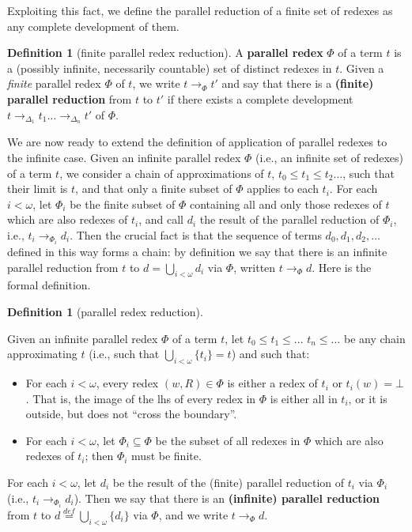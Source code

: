 \documentclass{eptcs}
\theoremstyle{plain}
\theoremstyle{definition}
\newtheorem{definition}[theorem]{Definition}
\begin{document}
Exploiting this fact, we define the parallel reduction  
of a finite set of redexes as any complete development of them.


\begin{definition} [finite parallel redex reduction]
\label{de:parallel-rdx}
A {\bf parallel redex} $\Phi$ of a term $t$ is a (possibly infinite, 
necessarily
countable) set of distinct redexes in $t$.  
Given a {\em finite} parallel redex $\Phi$ of $t$, we write $t 
\rightarrow_\Phi t'$ and say that there is a {\bf (finite) parallel 
reduction} 
from $t$ 
to $t'$ if there exists a complete development $t 
\rightarrow_{\Delta_1} 
t_1 \ldots \rightarrow_{\Delta_n} t'$ of $\Phi$.
\end{definition} 

We are now ready to extend the definition of application 
of parallel redexes to the infinite case. 
Given an infinite parallel redex 
$\Phi$ 
(i.e., an infinite set of redexes) of a term $t$, we consider a chain 
of 
approximations of $t$, $t_0 \le t_1 \le t_2 \ldots$, such that their 
limit is $t$, and that only a finite subset of $\Phi$ applies to each 
$t_i$. For each $i < \omega$, let $\Phi_i$ be the finite subset of 
$\Phi$ 
containing all and only those redexes of $t$ which are also redexes of 
$t_i$, and call $d_i$ the result of the parallel reduction of 
$\Phi_i$, 
i.e., $t_i \rightarrow_{\Phi_i} d_i$. Then the crucial fact is that 
the  
sequence of terms $d_0, 
d_1, d_2, \ldots$ defined in this way forms a chain: by definition we 
say 
that there is an infinite parallel reduction from $t$ to $d = 
\bigcup_{i<\omega}d_i$ via $\Phi$, written $t \rightarrow_\Phi d$.
Here is the formal definition.



\begin{definition}
[parallel redex reduction]
\label{de:par-rdx-app}

Given an infinite parallel redex $\Phi$ of a term $t$,
let $t_0 \le t_1 \le \ldots$ $t_n \le \ldots$ be any chain approximating 
$t$ (i.e., such that $\bigcup_{i<\omega}\{t_i\} = t$) and such that:

\begin{itemize}
\item For each $i < \omega$, every redex  $(w, R) \in \Phi$ is either 
a 
redex of $t_i$ or $t_i(w) = \bot$. That is, the image of the lhs of 
every 
redex in $\Phi$ is either all in $t_i$, or it is outside, but does not 
``cross the boundary''.  

\item For each $i < \omega$, let $\Phi_i \subseteq \Phi$ be the subset 
of 
all redexes in $\Phi$ which are also redexes of $t_i$; then $\Phi_i$ 
must be 
finite.
\end{itemize}

\noindent 
For each $i < \omega$, let $d_i$ be the result of 
the (finite) parallel reduction of $t_i$ via $\Phi_i$ (i.e., $t_i 
\rightarrow_{\Phi_i} d_i$). Then we say that there is an 
{\bf (infinite) parallel reduction} from $t$ 
to $d \stackrel{def}{=}  \bigcup_{i<\omega}\{d_i\}$ via $\Phi$, and we 
write 
$t \rightarrow_\Phi d$. 
\end{definition}
\end{document}
